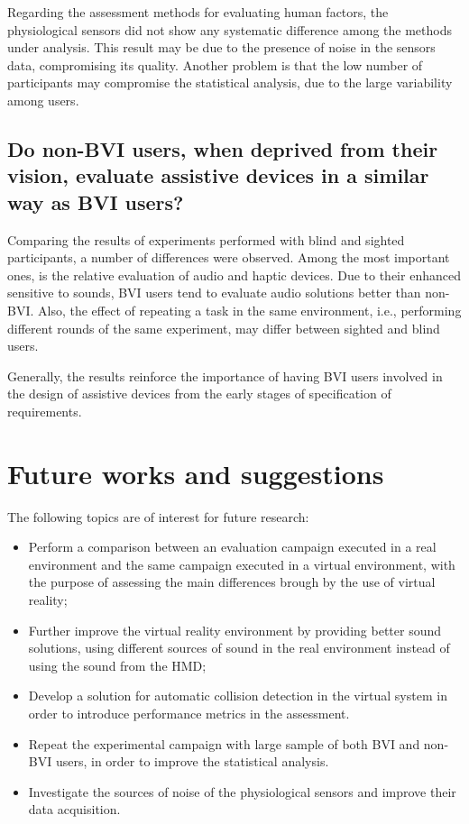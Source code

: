 Regarding the assessment methods for evaluating human factors, the physiological sensors did not show any systematic difference among the methods under analysis. This result may be due to the presence of noise in the sensors data, compromising its quality. Another problem is that the low number of participants may compromise the statistical analysis, due to the large variability among users.

\subsection*{Do non-BVI users, when deprived from their vision, evaluate assistive devices in a similar way as BVI users?}

Comparing the results of experiments performed with blind and sighted participants, a number of differences were observed. Among the most important ones, is the relative evaluation of audio and haptic devices. Due to their enhanced sensitive to sounds, BVI users tend to evaluate audio solutions better than non-BVI. Also, the effect of repeating a task in the same environment, i.e., performing different rounds of the same experiment, may differ between sighted and blind users.

Generally, the results reinforce the importance of having BVI users involved in the design of assistive devices from the early stages of specification of requirements.


\section{Future works and suggestions}

The following topics are of interest for future research:

\begin{itemize}
    \item Perform a comparison between an evaluation campaign executed in a real environment and the same campaign executed in a virtual environment, with the purpose of assessing the main differences brough by the use of virtual reality;
    \item Further improve the virtual reality environment by providing better sound solutions, using different sources of sound in the real environment instead of using the sound from the HMD;
    \item Develop a solution for automatic collision detection in the virtual system in order to introduce performance metrics in the assessment.
    \item Repeat the experimental campaign with large sample of both BVI and non-BVI users, in order to improve the statistical analysis.
    \item Investigate the sources of noise of the physiological sensors and improve their data acquisition.
\end{itemize}